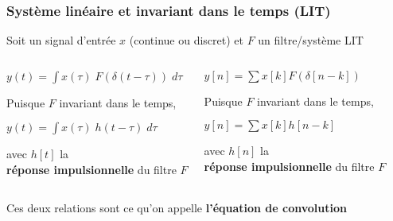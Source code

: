 \documentclass{beamer}
\begin{document}
\begin{frame} 
\frametitle{Système linéaire et invariant dans le temps (LIT) }
Soit un signal d'entrée $x$ (continue ou discret) et $F$ un filtre/système LIT\\
\vspace{1 cm}
\begin{columns}
\column{65mm}
\begin{center}
$y(t) = \displaystyle \int x(\tau) \; F(\delta(t-\tau) ) \;d\tau$\\
\vspace{0.5cm}

Puisque $F$ invariant dans le temps,\\
\vspace{0.5cm}

$y(t) = \displaystyle \int x(\tau) \; h(t-\tau) \; d\tau$\\
\vspace{0.5cm}

avec $h[t]$ la\\ \textbf{réponse impulsionnelle} du filtre $F$

\end{center}

\column{55mm}
\begin{center}

$ y[n] = \displaystyle\sum x[k]  F(\delta[n-k]) $ \\
\vspace{0.5cm}

Puisque $F$ invariant dans le temps,\\
\vspace{0.5cm}

$ y[n] = \displaystyle\sum x[k]  h[n-k] $ \\
\vspace{0.5cm}

avec $h[n]$ la\\ \textbf{réponse impulsionnelle} du filtre $F$

\end{center}
\end{columns}
\begin{block}{}
Ces deux relations sont ce qu'on appelle \textbf{l'équation de convolution}
\end{block}
\end{frame}
\end{document}
